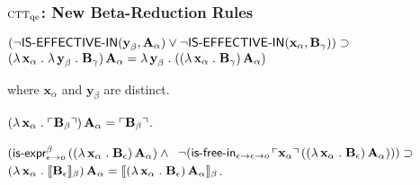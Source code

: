 \documentclass[t,12pt,numbers,fleqn]{beamer}
\newcommand{\churchqe}{$\mbox{\sc ctt}_{\rm qe}$}
\begin{document}
\begin{frame}
\frametitle{{\churchqe}: New Beta-Reduction Rules}
\bi

  \item {}

\medskip

$(\neg \mbox{\sf IS-EFFECTIVE-IN}(\textbf{y}_\beta,\textbf{A}_\alpha)\vee
    \neg \mbox{\sf IS-EFFECTIVE-IN}(\textbf{x}_\alpha,\textbf{B}_\gamma))
    \supset {}$ 
\hspace*{2ex}$(\lambda\, \textbf{x}_\alpha \mathrel.
    \lambda\, \textbf{y}_\beta \mathrel. \textbf{B}_\gamma) \,
    \textbf{A}_\alpha = \lambda\, \textbf{y}_\beta \mathrel. ((\lambda\,
    \textbf{x}_\alpha \mathrel. \textbf{B}_\gamma) \,
    \textbf{A}_\alpha)$

\medskip

where $\textbf{x}_\alpha$ and $\textbf{y}_\beta$ are distinct.

\medskip

  \item {}

\medskip

$(\lambda\, \textbf{x}_\alpha \mathrel. \ulcorner\textbf{B}_\beta\urcorner) \,
    \textbf{A}_\alpha = \ulcorner\textbf{B}_\beta\urcorner$.

\medskip

  \item {}

\medskip

$(\mbox{\sf is-expr}_{\epsilon \rightarrow o}^{\beta} \, ((\lambda\,
    \textbf{x}_\alpha \mathrel. \textbf{B}_\epsilon) \, \textbf{A}_\alpha)
    \wedge {}$
\hspace*{2ex} $\neg(\mbox{\sf is-free-in}_{\epsilon \rightarrow \epsilon
  \rightarrow o} \, \ulcorner\textbf{x}_\alpha\urcorner \, ((\lambda\,
\textbf{x}_\alpha \mathrel. \textbf{B}_\epsilon) \, \textbf{A}_\alpha)))
\supset {}$
\hspace*{6ex} $(\lambda\, \textbf{x}_\alpha \mathrel.
\llbracket\textbf{B}_\epsilon\rrbracket_\beta) \, \textbf{A}_\alpha =
\llbracket(\lambda\, \textbf{x}_\alpha \mathrel. \textbf{B}_\epsilon) \,
  \textbf{A}_\alpha\rrbracket_\beta$.

\ei
\end{frame}

\end{document}
